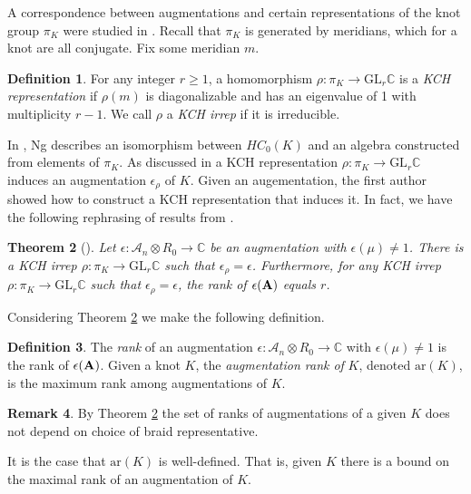 \documentclass[11pt]{amsart}
\def\C{{\mathbb C}}
\def\A{{\mathcal A}}
\newtheorem{thm}{Theorem}[section]
\theoremstyle{definition}
\newtheorem{defn}[thm]{Definition}
\newtheorem{rem}[thm]{Remark}
\begin{document}
  A correspondence between augmentations and certain representations of the knot group $\pi_K$ were studied in \cite{Cor13a}. Recall that $\pi_K$ is generated by meridians, which for a knot are all conjugate. Fix some meridian $m$.

  \begin{defn}
  For any integer $r\ge1$, a homomorphism $\rho:\pi_K\to\text{GL}_r\C$ is a \emph{KCH representation} if $\rho(m)$ is diagonalizable and has an eigenvalue of 1 with multiplicity $r-1$. We call $\rho$ a \emph{KCH irrep} if it is irreducible.
  \label{defn:KCHReps}
  \end{defn}

  In \cite{Ng08}, Ng describes an isomorphism between $HC_0(K)$ and an algebra constructed from elements of $\pi_K$. As discussed in \cite{Ng12} a KCH representation $\rho:\pi_K\to\text{GL}_r\C$ induces an augmentation $\epsilon_\rho$ of $K$. Given an augementation, the first author showed how to construct a KCH representation that induces it. In fact, we have the following rephrasing of results from \cite{Cor13a}.

  \begin{thm}[\cite{Cor13a}]
  Let $\epsilon:\A_n\otimes R_0\to\C$ be an augmentation with $\epsilon(\mu)\ne 1$. There is a KCH irrep $\rho:\pi_K\to\text{GL}_r\C$ such that $\epsilon_\rho=\epsilon$. Furthermore, for any KCH irrep $\rho:\pi_K\to\text{GL}_r\C$ such that $\epsilon_\rho = \epsilon$, the rank of $\epsilon({\bf A})$ equals $r$.
  \label{thm:AugKCH_Corresp}
  \end{thm}

  Considering Theorem \ref{thm:AugKCH_Corresp} we make the following definition.

  \begin{defn}
  The \emph{rank} of an augmentation $\epsilon:\A_n\otimes R_0\to\C$ with $\epsilon(\mu)\ne 1$ is the rank of $\epsilon({\bf A})$. Given a knot $K$, the \emph{augmentation rank of} $K$, denoted $\text{ar}(K)$, is the maximum rank among augmentations of $K$.
  \label{defn:AugRk}
  \end{defn}

  \begin{rem} By Theorem \ref{thm:AugKCH_Corresp} the set of ranks of augmentations of a given $K$ does not depend on choice of braid representative.
  \end{rem}

  It is the case that $\text{ar}(K)$ is well-defined. That is, given $K$ there is a bound on the maximal rank of an augmentation of $K$.
\end{document}
